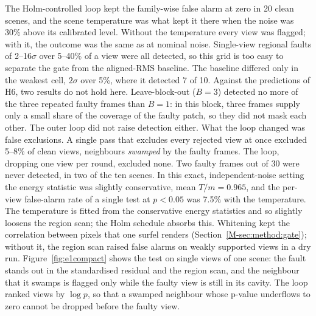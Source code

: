 The Holm-controlled loop kept the family-wise false alarm at zero in 20 clean scenes, and the scene
temperature was what kept it there when the noise was 30\% above its calibrated level. Without the
temperature every view was flagged; with it, the outcome was the same as at nominal noise. Single-view
regional faults of 2--16$\sigma$ over 5--40\% of a view were all detected, so this grid is too easy to
separate the gate from the aligned-RMS baseline. The baseline differed only in the weakest cell, $2\sigma$
over 5\%, where it detected 7 of 10. Against the predictions of H6, two results do not hold here.
Leave-block-out ($B=3$) detected no more of the three repeated faulty frames than $B=1$: in this block,
three frames supply only a small share of the coverage of the faulty patch, so they did not mask each
other. The outer loop did not raise detection either. What the loop changed was false exclusions. A
single pass that excludes every rejected view at once excluded 5--8\% of clean views, neighbours
\emph{swamped} by the faulty frames. The loop, dropping one view per round, excluded none. Two faulty
frames out of 30 were never detected, in two of the ten scenes. In this exact, independent-noise setting
the energy statistic was slightly conservative, mean $T/m=0.965$, and the per-view false-alarm rate of a
single test at $p<0.05$ was 7.5\% with the temperature. The temperature is fitted from the conservative
energy statistics and so slightly loosens the region scan; the Holm schedule absorbs this. Whitening kept the correlation between pixels that one surfel renders (Section~\ref{M-sec:method:gate});
without it, the region scan raised false alarms on weakly supported views in a dry run. Figure~\ref{fig:e1compact} shows the test on single views of one
scene: the fault stands out in the standardised residual and the region scan, and the neighbour that it
swamps is flagged only while the faulty view is still in its cavity. The loop
ranked views by $\log p$, so that a swamped neighbour whose p-value underflows to zero cannot be
dropped before the faulty view.

\begin{table}[!t]
\caption{E1 summary on MatrixCity block~3 (exact depth, independent noise, linearised gate). Clean
scenes: 20 seeds per condition; one faulty view: 160 scenes (4 magnitudes $\times$ 4 areas $\times$ 10
seeds), detection at a per-view threshold matched to 5\% false alarm on clean scenes; three neighbouring
faulty frames: 10 seeds per row; clean excluded is the share of clean views excluded. Runtime is CPU
wall-clock per stage; a gate pass tests every active view once.}
\label{tab:e1}
\centering\footnotesize\setlength{\tabcolsep}{3pt}

\end{table}

